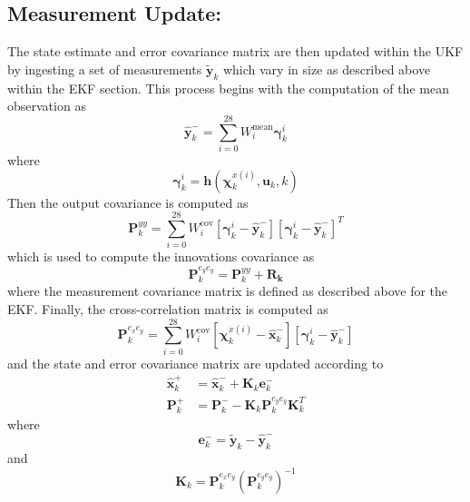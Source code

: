 \documentclass[letterpaper, paper,11pt]{AAS}		%
\begin{document}
\subsection{Measurement Update:}
The state estimate and error covariance matrix are then updated within the UKF by ingesting a set of measurements $\tilde{\mathbf{y}}_k$ which vary in size as described above within the EKF section. This process begins with the computation of the mean observation as \cite{Crassidis_2004}
\begin{equation}
	\hat{\mathbf{y}}_k^- = \sum_{i=0}^{28}W_i^\text{mean} \boldsymbol{\gamma}_k^i
\end{equation}
where
\begin{equation}
	\boldsymbol{\gamma}_k^i = \mathbf{h}(\boldsymbol{\chi}_k^{x(i)}, \mathbf{u}_k,k)
\end{equation}
Then the output covariance is computed as 
\begin{equation}
	\mathbf{P}_k^{yy} = \sum_{i=0}^{28}W_i^\text{cov}\left[\boldsymbol{\gamma}_k^i-\hat{\mathbf{y}}_k^-\right]\left[\boldsymbol{\gamma}_k^i-\hat{\mathbf{y}}_k^-\right]^T
\end{equation}
which is used to compute the innovations covariance as
\begin{equation}
	\mathbf{P}_k^{e_ye_y}=\mathbf{P}_k^{yy} + \mathbf{R_k}
\end{equation}
where the measurement covariance matrix is defined as described above for the EKF. Finally, the cross-correlation matrix is computed as \cite{Crassidis_2004}
\begin{equation}
	\mathbf{P}_k^{e_xe_y} = \sum_{i=0}^{28}W_i^\text{cov}\left[\boldsymbol{\chi}_k^{x(i)}-\hat{\mathbf{x}}_k^-\right]\left[\boldsymbol{\gamma}_k^i - \hat{\mathbf{y}}_k^-\right]
\end{equation}
and the state and error covariance matrix are updated according to
\begin{align}
	\hat{\mathbf{x}}_k^+ &= \hat{\mathbf{x}}_k^- + \mathbf{K}_k\mathbf{e}_k^- \\
	\mathbf{P}_k^+ &= \mathbf{P}_k^- - \mathbf{K}_k\mathbf{P}_k^{e_ye_y}\mathbf{K}_k^T
\end{align}
where 
\begin{equation}
	\mathbf{e}_k^- = \tilde{\mathbf{y}}_k - \hat{\mathbf{y}}_k^-
\end{equation}
and
\begin{equation}
	\mathbf{K}_k = \mathbf{P}_k^{e_xe_y}\left(\mathbf{P}_k^{e_ye_y}\right)^{-1}
\end{equation}
\end{document}
